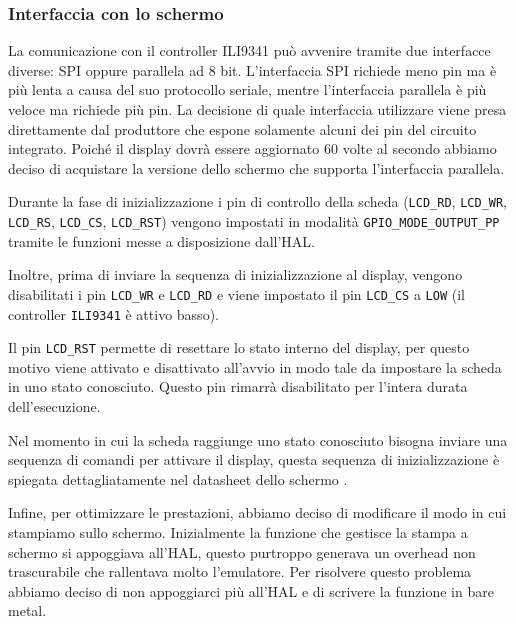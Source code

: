 \documentclass[a4paper]{article}
\begin{document}
\subsubsection{Interfaccia con lo schermo}

La comunicazione con il controller ILI9341 può avvenire tramite due interfacce diverse:
SPI oppure parallela ad 8 bit. L'interfaccia SPI richiede meno pin ma è più lenta
a causa del suo protocollo seriale, mentre l'interfaccia parallela è più veloce ma
richiede più pin. La decisione di quale interfaccia utilizzare viene presa direttamente
dal produttore che espone solamente alcuni dei pin del circuito integrato. Poiché il display
dovrà essere aggiornato 60 volte al secondo abbiamo deciso di acquistare la versione dello
schermo che supporta l'interfaccia parallela.

Durante la fase di inizializzazione i pin di controllo della scheda
(\texttt{LCD\_RD}, \texttt{LCD\_WR}, \texttt{LCD\_RS}, \texttt{LCD\_CS}, \texttt{LCD\_RST})
vengono impostati in modalità \texttt{GPIO\_MODE\_OUTPUT\_PP} tramite le funzioni messe a
disposizione dall'HAL.

Inoltre, prima di inviare la sequenza di inizializzazione al display, vengono disabilitati i pin
\texttt{LCD\_WR} e \texttt{LCD\_RD} e viene impostato il pin \texttt{LCD\_CS} a
\texttt{LOW} (il controller \texttt{ILI9341} è attivo basso).

Il pin \texttt{LCD\_RST} permette di resettare lo stato interno del display, per questo
motivo viene attivato e disattivato all'avvio in modo tale da impostare la scheda in uno
stato conosciuto. Questo pin rimarrà disabilitato per l'intera durata dell'esecuzione.

Nel momento in cui la scheda raggiunge uno stato conosciuto bisogna inviare una sequenza di
comandi per attivare il display, questa sequenza di inizializzazione è spiegata dettagliatamente
nel datasheet dello schermo \cite{ili9341}.

Infine, per ottimizzare le prestazioni, abbiamo deciso di modificare il modo in cui stampiamo
sullo schermo. Inizialmente la funzione che gestisce la stampa a schermo si appoggiava
all'HAL, questo purtroppo generava un overhead non trascurabile che rallentava molto
l'emulatore. Per risolvere questo problema abbiamo deciso di non appoggiarci più all'HAL e
di scrivere la funzione in bare metal.
\end{document}
